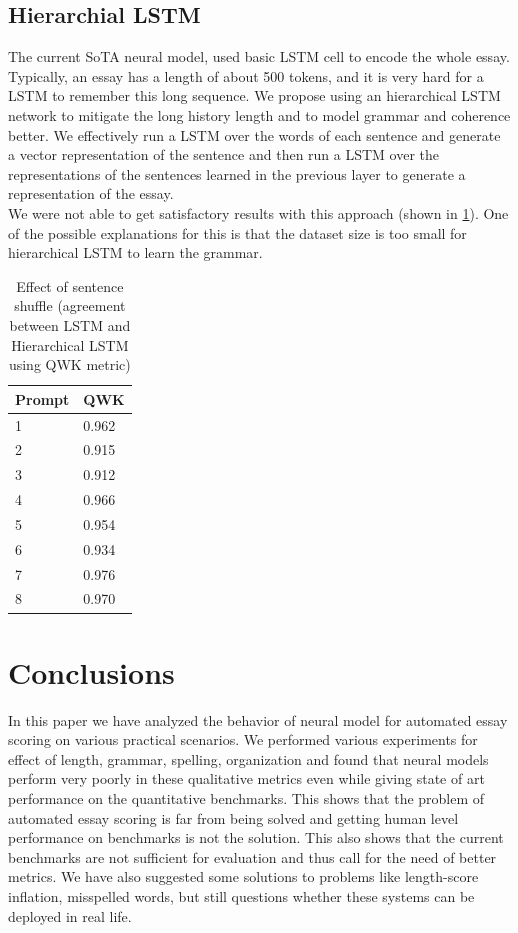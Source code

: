 \documentclass[11pt,a4paper]{article}
\newcommand{\acomment}[1]{{\bf{\color{blue}{{[Aman: #1]}}}}}
\begin{document}
  


\subsection{Hierarchial LSTM}

The current SoTA neural model, used basic LSTM cell to encode the whole essay. Typically, an essay has a length of about 500 tokens, and it is very hard for a LSTM to remember this long sequence. We propose using an hierarchical LSTM network to mitigate the long history length and to model grammar and coherence better. We effectively run a LSTM over the words of each sentence and generate a vector representation of the sentence and then run a LSTM over the representations of the sentences learned in the previous layer to generate a representation of the essay.\\ 
We were not able to get satisfactory results with this approach (shown in \cref{hlstm}). One of the possible explanations for this is that the dataset size is too small for hierarchical LSTM to learn the grammar.


\begin{table}[]
  \centering
  \begin{tabular}{|l|l|}
  \hline
  \textbf{Prompt} & \textbf{QWK} \\ \hline
  1 & 0.962 \\ \hline
  2 & 0.915 \\ \hline
  3 & 0.912 \\ \hline
  4 & 0.966 \\ \hline
  5 & 0.954 \\ \hline
  6 & 0.934 \\ \hline
  7 & 0.976 \\ \hline
  8 & 0.970 \\ \hline
  \end{tabular}
  \caption{Effect of sentence shuffle (agreement between LSTM and Hierarchical LSTM using QWK metric)}
  \label{hlstm}
\end{table}


\section{Conclusions}
In this paper we have analyzed the behavior of neural model for automated essay scoring on various practical scenarios. We performed various experiments for effect of length, grammar, spelling, organization and found that neural models perform very poorly in these qualitative metrics even while giving state of art performance on the quantitative benchmarks. This shows that the problem of automated essay scoring is far from being solved and getting human level performance on benchmarks is not the solution. This also shows that the current benchmarks are not sufficient for evaluation and thus call for the need of better metrics. We have also suggested some solutions to problems like length-score inflation, misspelled words, but still questions whether these systems can be deployed in real life.




\end{document}
